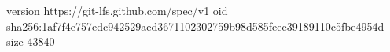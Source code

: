 version https://git-lfs.github.com/spec/v1
oid sha256:1af7f4e757edc942529aed3671102302759b98d585feee39189110c5fbe4954d
size 43840

